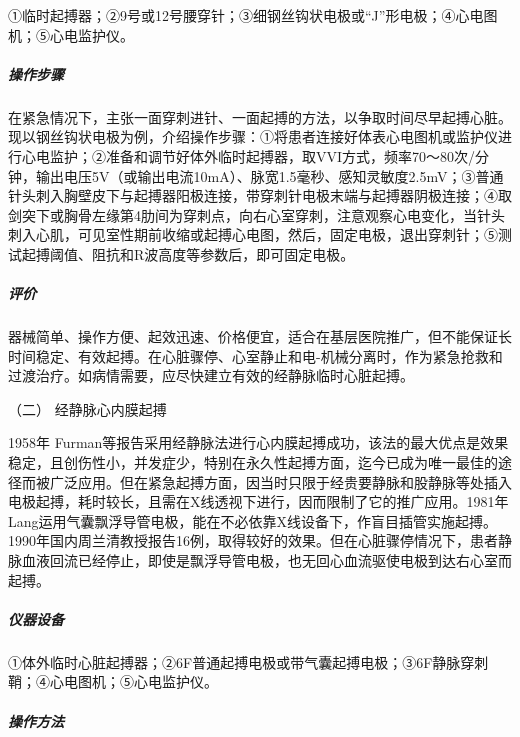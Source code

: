 ①临时起搏器；②9号或12号腰穿针；③细钢丝钩状电极或“J”形电极；④心电图机；⑤心电监护仪。

\subparagraph{操作步骤}

在紧急情况下，主张一面穿刺进针、一面起搏的方法，以争取时间尽早起搏心脏。现以钢丝钩状电极为例，介绍操作步骤：①将患者连接好体表心电图机或监护仪进行心电监护；②准备和调节好体外临时起搏器，取VVI方式，频率70～80次/分钟，输出电压5V（或输出电流10mA）、脉宽1.5毫秒、感知灵敏度2.5mV；③普通针头刺入胸壁皮下与起搏器阳极连接，带穿刺针电极末端与起搏器阴极连接；④取剑突下或胸骨左缘第4肋间为穿刺点，向右心室穿刺，注意观察心电变化，当针头刺入心肌，可见室性期前收缩或起搏心电图，然后，固定电极，退出穿刺针；⑤测试起搏阈值、阻抗和R波高度等参数后，即可固定电极。

\subparagraph{评价}

器械简单、操作方便、起效迅速、价格便宜，适合在基层医院推广，但不能保证长时间稳定、有效起搏。在心脏骤停、心室静止和电-机械分离时，作为紧急抢救和过渡治疗。如病情需要，应尽快建立有效的经静脉临时心脏起搏。

\hypertarget{text00375.htmlux5cux23CHP16-5-3-2}{}
（二） 经静脉心内膜起搏

1958年
Furman等报告采用经静脉法进行心内膜起搏成功，该法的最大优点是效果稳定，且创伤性小，并发症少，特别在永久性起搏方面，迄今已成为唯一最佳的途径而被广泛应用。但在紧急起搏方面，因当时只限于经贵要静脉和股静脉等处插入电极起搏，耗时较长，且需在X线透视下进行，因而限制了它的推广应用。1981年Lang运用气囊飘浮导管电极，能在不必依靠X线设备下，作盲目插管实施起搏。1990年国内周兰清教授报告16例，取得较好的效果。但在心脏骤停情况下，患者静脉血液回流已经停止，即使是飘浮导管电极，也无回心血流驱使电极到达右心室而起搏。

\subparagraph{仪器设备}

①体外临时心脏起搏器；②6F普通起搏电极或带气囊起搏电极；③6F静脉穿刺鞘；④心电图机；⑤心电监护仪。

\subparagraph{操作方法}

